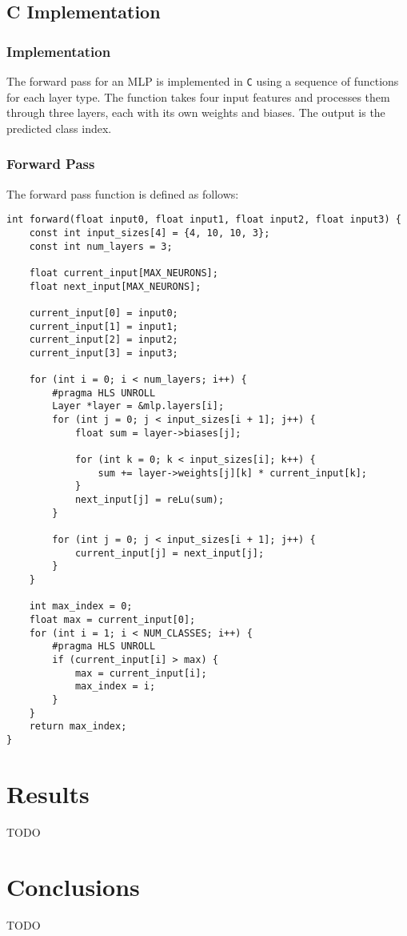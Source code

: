 \documentclass{article}
\begin{document}
\subsection{C Implementation}
\subsubsection{Implementation}
The forward pass for an MLP is implemented in \texttt{C} using a sequence of functions for each layer type. The function takes four input features and processes them through three layers, each with its own weights and biases. The output is the predicted class index.


\subsubsection{Forward Pass}
The forward pass function is defined as follows:
\begin{lstlisting}
int forward(float input0, float input1, float input2, float input3) {
    const int input_sizes[4] = {4, 10, 10, 3};
    const int num_layers = 3;

    float current_input[MAX_NEURONS];
    float next_input[MAX_NEURONS];

    current_input[0] = input0;
    current_input[1] = input1;
    current_input[2] = input2;
    current_input[3] = input3;

    for (int i = 0; i < num_layers; i++) {
        #pragma HLS UNROLL
        Layer *layer = &mlp.layers[i];
        for (int j = 0; j < input_sizes[i + 1]; j++) {
            float sum = layer->biases[j];
            
            for (int k = 0; k < input_sizes[i]; k++) {
                sum += layer->weights[j][k] * current_input[k];
            }
            next_input[j] = reLu(sum);
        }

        for (int j = 0; j < input_sizes[i + 1]; j++) {
            current_input[j] = next_input[j];
        }
    }

    int max_index = 0;
    float max = current_input[0];
    for (int i = 1; i < NUM_CLASSES; i++) {
        #pragma HLS UNROLL
        if (current_input[i] > max) {
            max = current_input[i];
            max_index = i;
        }
    }
    return max_index;
}
\end{lstlisting}


\section{Results}
TODO

\section{Conclusions}
TODO
\end{document}
